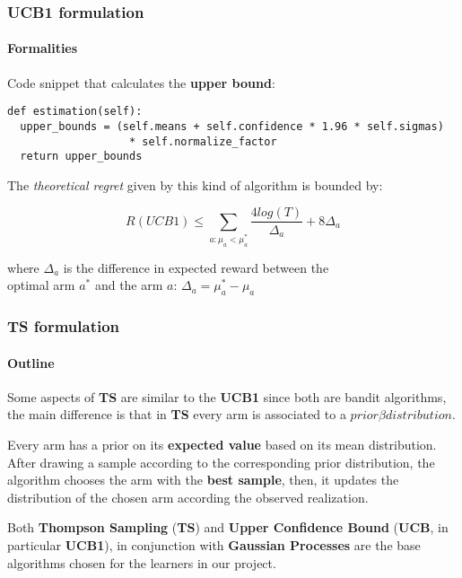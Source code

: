 \documentclass[11pt]{beamer}
\begin{document}

\begin{frame}[fragile]

\frametitle{UCB1 formulation}
\framesubtitle{Formalities}

Code snippet that calculates the \textbf{upper bound}:

\begin{lstlisting}[style=Python, basicstyle=\tiny, numbers=none, framexrightmargin=-20pt]
def estimation(self):
  upper_bounds = (self.means + self.confidence * 1.96 * self.sigmas)
                   * self.normalize_factor
  return upper_bounds
\end{lstlisting}

The \textit{theoretical regret} given by this kind of algorithm is bounded by:

\begin{displaymath}
R(UCB1) \le \sum_{a:\mu_a < \mu_a^*} \frac{4log(T)}{\Delta_a} + 8\Delta_a
\end{displaymath}

where $\Delta_a$ is the difference in expected reward between the \\ optimal arm $a^*$ and the arm $a$: $\Delta_a = \mu_a^* - \mu_a$

\end{frame}


\begin{frame}

\frametitle{TS formulation}
\framesubtitle{Outline}

Some aspects of \textbf{TS} are similar to the \textbf{UCB1} since both are bandit algorithms, the main difference is that in \textbf{TS} every arm is associated to a $prior \beta distribution$.

Every arm has a prior on its \textbf{expected value} based on its mean distribution.
After drawing a sample according to the corresponding prior distribution, the algorithm chooses the arm with the \textbf{best sample}, then, it updates the distribution of the chosen arm according the observed realization.

Both \textbf{Thompson Sampling} (\textbf{TS}) and \textbf{Upper Confidence Bound} (\textbf{UCB}, in particular \textbf{UCB1}), in conjunction with \textbf{Gaussian Processes} are the base algorithms chosen for the learners in our project.

\end{frame}
\end{document}
